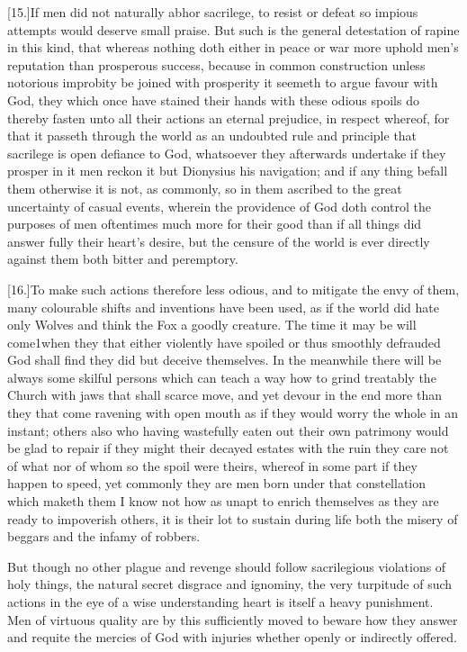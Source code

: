 [15.]If men did not naturally abhor sacrilege, to resist or defeat so impious attempts would deserve small praise. But such is the general detestation of rapine in this kind, that whereas nothing doth either in peace or war more uphold men’s reputation than prosperous success, because in common construction unless notorious improbity be joined with prosperity it seemeth to argue favour with God, they which once have stained their hands with these odious spoils do thereby fasten unto all their actions an eternal prejudice, in respect whereof, for that it passeth through the world as an undoubted rule and principle that sacrilege is open defiance to God, whatsoever they afterwards undertake if they prosper in it men reckon it but Dionysius his navigation; and if any thing befall them otherwise it is not, as commonly, so in them ascribed to the great uncertainty of casual events, wherein the providence of God doth control the purposes of men oftentimes much more for their good than if all things did answer fully their heart’s desire, but the censure of the world is ever directly against them both bitter and peremptory.




[16.]To make such actions therefore less odious, and to mitigate the envy of them, many colourable shifts and inventions have been used, as if the world did hate only Wolves and think the Fox a goodly creature. The time it may be will come1when they that either violently have spoiled or thus smoothly defrauded God shall find they did but deceive themselves. In the meanwhile there will be always some skilful persons which can teach a way how to grind treatably the Church with jaws that shall scarce move, and yet devour in the end more than they that come ravening with open mouth as if they would worry the whole in an instant; others also who having wastefully eaten out their own patrimony would be glad to repair if they might their decayed estates with the ruin they care not of what nor of whom so the spoil were theirs, whereof in some part if they happen to speed, yet commonly they are men born under that constellation which maketh them I know not how as unapt to enrich themselves as they are ready to impoverish others, it is their lot to sustain during life both the misery of beggars and the infamy of robbers.

But though no other plague and revenge should follow sacrilegious violations of holy things, the natural secret disgrace and ignominy, the very turpitude of such actions in the eye of a wise understanding heart is itself a heavy punishment. Men of virtuous quality are by this sufficiently  moved to beware how they answer and requite the mercies of God with injuries whether openly or indirectly offered.

